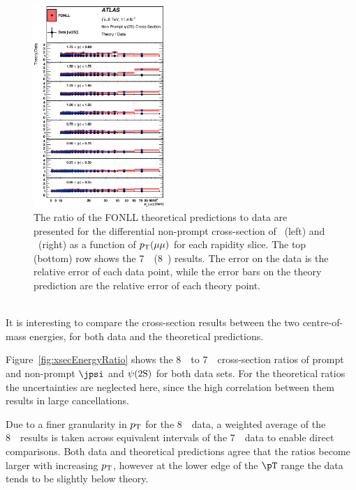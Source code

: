 \begin{description}[style=unboxed,leftmargin=0cm]
\begin{figure} [!ht]
\begin{center}
    \includegraphics[width=0.44\textwidth]{figures/ct_8TeV_Psi2SNP_theoryRatio_lin.eps}\hfil
    \caption{The ratio of the FONLL theoretical predictions to data are presented for the differential non-prompt 
    cross-section of \jpsi\ (left) and \psiprime\ (right) as a function 
    of $\mbox{$p_{\text{T}}$}(\mu\mu)$ for each rapidity slice. 
    The top (bottom) row shows the 7~\TeV\ (8~\TeV) results.
    The error on the data is the relative error of each data point, while the error bars on the theory prediction are the relative error of each theory point.}
    \label{fig:xsecNPtheoryRatio}
  \end{center}
\end{figure} 


\item[Comparison of cross-sections 8~\TeV\  with 7~\TeV\ ] \hfill \\

It is interesting to compare the cross-section results between the two centre-of-mass energies, for both data and the theoretical predictions.

Figure~\ref{fig:xsecEnergyRatio} shows the 8~\TeV\  to 7~\TeV\  cross-section ratios of prompt and non-prompt $\jpsi$ and $\psi(2\mathrm{S})$ for both data sets.
For the theoretical ratios the uncertainties are neglected here, since the high correlation between them results in large cancellations.


Due to a finer granularity in $\mbox{$p_{\text{T}}$}$ for the 8~\TeV\  data, a weighted average of the 8~\TeV\ results is taken across equivalent intervals of the 7~\TeV\ data to enable direct comparisons.
Both data and theoretical predictions agree 
that the ratios become larger with increasing $\mbox{$p_{\text{T}}$}$,
however at the lower edge of the $\pT$ range the data tends to be slightly below theory.



\end{description}
